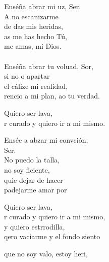 \begin{cancion}[Resucitados][]%
	Enséña abrar mi uz, Ser. \\
	A no escanizarme \\
	de das mis heridas, \\
	as me has hecho Tú, \\
	 me amas, mi Dios.  \\
{}\vspace*{-0.4cm}\\
	Enséña abrar tu voluad, Sor,  \\
	si no o apartar \\
	el cálize mi realidad, \\
	rencio a mi plan, ao tu verdad. \\
	\begin{chorus}%
	Quiero  ser lava, \\
	r curado y quiero ir a mi mismo. \\
	\end{chorus}%
	Ensée a abzar mi convción, \\
	Ser. \\
	No puedo la talla, \\
	no soy ficiente, \\
	quie dejar de hacer \\
	padejarme amar por  \\
	\begin{chorus}%
	Quiero  ser lava, \\
	r curado y quiero ir a mi mismo, \\
	y quiero estrrodilla,  \\
	qero vaciarme y el fondo siento\\
	\end{chorus}%
	que no soy valo, estoy heri, \\

\end{cancion}
